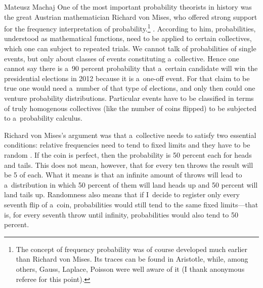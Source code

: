 \begin{artengenv}{Mateusz Machaj}
One of the most important probability theorists in history was the great Austrian mathematician Richard von Mises, who offered strong support for the frequency interpretation of probability.\footnote{The concept of frequency probability was of course developed much earlier than Richard von Mises. Its traces can be found in Aristotle, while, among others, Gauss, Laplace, Poisson were well aware of it (I thank anonymous referee for this point).} 
\parencites[Modern, mainstream axiomatic foundations were built by Andrey Kolmogorov; see][pp.17–18]{howson_theories_1995}. %
 According to him, probabilities, understood as mathematical functions, need to be applied to certain collectives, which one can subject to repeated trials. We cannot talk of probabilities of single events, but only about classes of events constituting a~collective. Hence one cannot say there is a~90 percent probability that a~certain candidate will win the presidential elections in 2012 because it is a~one-off event. For that claim to be true one would need a~number of that type of elections, and only then could one venture probability distributions. Particular events have to be classified in terms of truly homogenous collectives (like the number of coins flipped) to be subjected to a~probability calculus.



Richard von Mises's argument was that a~collective needs to satisfy two essential conditions: relative frequencies need to tend to fixed limits and they have to be random 
\parencite[][pp.28–29]{mises_probability_1957}. %
 If the coin is perfect, then the probability is 50 percent each for heads and tails. This does not mean, however, that for every ten throws the result will be 5 of each. What it means is that an infinite amount of throws will lead to a~distribution in which 50 percent of them will land heads up and 50 percent will land tails up. Randomness also means that if I~decide to register only every seventh flip of a~coin, probabilities would still tend to the same fixed limits---that is, for every seventh throw until infinity, probabilities would also tend to 50 percent.




\end{artengenv}
